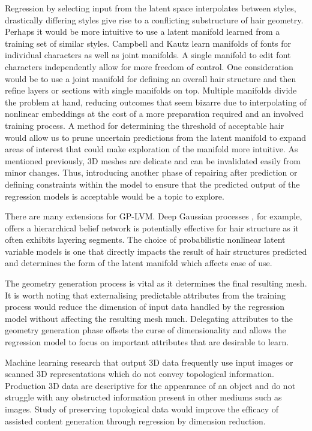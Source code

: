 \documentclass[ %
author={Dillon Keith Diep},
supervisor={Dr. Carl Henrik Ek},
degree={MEng},
title={ART-CG Hair:},
subtitle={Assisted Real-time Content Generation of Stylised Virtual Hair},
type={Research},
year={2017} ]{dissertation}
\begin{document}
	Regression by selecting input from the latent space interpolates between styles, drastically differing styles give rise to a conflicting substructure of hair geometry. Perhaps it would be more intuitive to use a latent manifold learned from a training set of similar styles.
	Campbell and Kautz \cite{fontmanifold} learn manifolds of fonts for individual characters as well as joint manifolds. A single manifold to edit font characters independently allow for more freedom of control. One consideration would be to use a joint manifold for defining an overall hair structure and then refine layers or sections with single manifolds on top. Multiple manifolds divide the problem at hand, reducing outcomes that seem bizarre due to interpolating of nonlinear embeddings at the cost of a more preparation required and an involved training process.
	A method for determining the threshold of acceptable hair would allow us to prune uncertain predictions from the latent manifold to expand areas of interest that could make exploration of the manifold more intuitive. 
	As mentioned previously, 3D meshes are delicate and can be invalidated easily from minor changes. Thus, introducing another phase of repairing after prediction or defining constraints within the model to ensure that the predicted output of the regression models is acceptable would be a topic to explore.
	
	There are many extensions for GP-LVM. Deep Gaussian processes \cite{deepgp}, for example, offers a hierarchical belief network is potentially effective for hair structure as it often exhibits layering segments.
	The choice of probabilistic nonlinear latent variable models is one that directly impacts the result of hair structures predicted and determines the form of the latent manifold which affects ease of use.
	
	The geometry generation process is vital as it determines the final resulting mesh. It is worth noting that externalising predictable attributes from the training process would reduce the dimension of input data handled by the regression model without affecting the resulting mesh much. Delegating attributes to the geometry generation phase offsets the curse of dimensionality and allows the regression model to focus on important attributes that are desirable to learn.
	
	Machine learning research that output 3D data frequently use input images or scanned 3D representations which do not convey topological information. Production 3D data are descriptive for the appearance of an object and do not struggle with any obstructed information present in other mediums such as images. Study of preserving topological data would improve the efficacy of assisted content generation through regression by dimension reduction.
	
\end{document}
